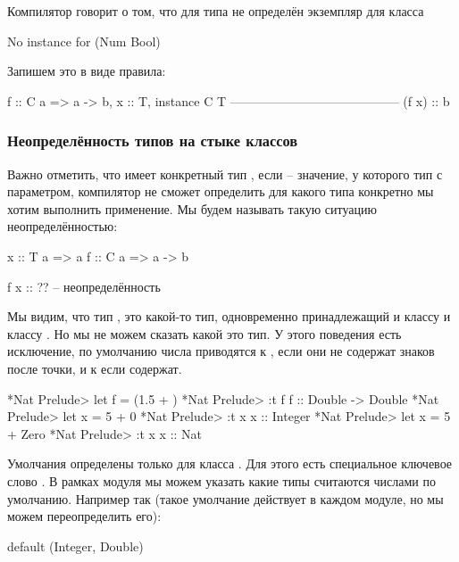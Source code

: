 Компилятор говорит о том, что для типа  не  
определён экземпляр для класса 

\begin{code}
No instance for (Num Bool) 
\end{code}

Запишем это в виде правила:

\begin{code}
                    f :: C a => a -> b,  x :: T, instance C T 
                    -----------------------------------------
                                (f x) :: b
\end{code}

\subsubsection{Неопределённость типов на стыке классов}

Важно отметить, что  имеет конкретный тип , 
если  -- значение, у которого тип с параметром, компилятор не сможет
определить для какого типа конкретно мы хотим выполнить применение. 
Мы будем называть такую ситуацию неопределённостью:

\begin{code}
x :: T a => a
f :: C a => a -> b

f x :: ??  -- неопределённость
\end{code}

Мы видим, что тип , это какой-то тип, одновременно принадлежащий
и классу  и классу . Но мы не можем сказать какой это
тип. У этого поведения есть исключение, по умолчанию 
числа приводятся к , если они не содержат знаков после точки,
и к  если содержат.

\begin{code}
*Nat Prelude> let f = (1.5 + )
*Nat Prelude> :t f
f :: Double -> Double
*Nat Prelude> let x = 5 + 0
*Nat Prelude> :t x
x :: Integer
*Nat Prelude> let x = 5 + Zero
*Nat Prelude> :t x
x :: Nat
\end{code}

Умолчания определены только для класса . Для этого
есть специальное ключевое слово . 
В рамках модуля мы можем указать какие типы считаются
числами по умолчанию. Например так (такое умолчание действует
в каждом модуле, но мы можем переопределить его):

\begin{code}
default (Integer, Double)
\end{code}

